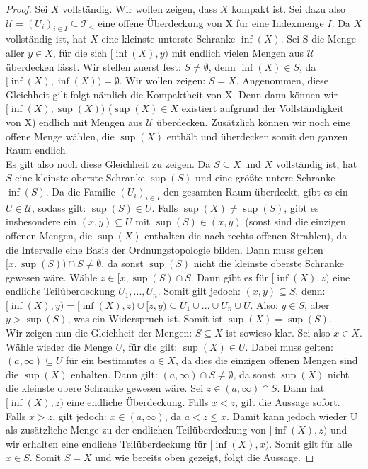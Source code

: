 \documentclass[11pt]{scrartcl}
\begin{document}
\begin{proof}
	Sei $X$ vollständig. Wir wollen zeigen, dass $X$ kompakt ist. Sei dazu also $\mathcal U = (U_i)_{i\in I} \subseteq \mathcal T_{<}$ eine offene Überdeckung von X für eine Indexmenge $I$.
	Da $X$ vollständig ist, hat $X$ eine kleinste unterste Schranke $\inf(X)$. Sei S die Menge aller $y\in X$, für die sich $[\inf(X), y)$ mit endlich vielen Mengen aus $\mathcal U$ überdecken lässt. 
	Wir stellen zuerst fest: $S\neq \emptyset$, denn $\inf(X)\in S$, da $[\inf(X), \inf(X))=\emptyset$. 
	Wir wollen zeigen: $S=X$. Angenommen, diese Gleichheit gilt folgt nämlich die Kompaktheit von X. Denn dann können wir $[\inf(X), \sup(X))$ ($\sup(X)\in X$ existiert aufgrund der Vollständigkeit von X) endlich mit Mengen aus $\mathcal U$ überdecken. 
	Zusätzlich können wir noch eine offene Menge wählen, die $\sup(X)$ enthält und überdecken somit den ganzen Raum endlich.\\
	Es gilt also noch diese Gleichheit zu zeigen. Da $S \subseteq X$ und $X$ vollständig ist, hat $S$ eine kleinste oberste Schranke $\sup(S)$ und eine größte untere Schranke $\inf(S)$. Da die Familie 
	$(U_i)_{i\in I}$ den gesamten Raum überdeckt, gibt es ein $U\in\mathcal U$, sodass gilt: $\sup(S)\in U$. Falls $\sup(X)\neq \sup(S)$, gibt es insbesondere ein $(x,y)\subseteq U$ mit $\sup(S)\in (x,y)$ 
	(sonst sind die einzigen offenen Mengen, die $\sup(X)$ enthalten die nach rechts offenen Strahlen),
	da die Intervalle eine Basis der Ordnungstopologie bilden. Dann muss gelten $[x, \sup(S)) \cap S \neq \emptyset$, da sonst $\sup(S)$ nicht die kleinste oberste Schranke gewesen wäre. Wähle $z\in 
	[x, \sup(S)\cap S$. Dann gibt es für $[\inf(X), z)$ eine endliche Teilüberdeckung $U_1,...,U_n$. Somit gilt jedoch: $(x,y)\subseteq S$, denn: $[\inf(X),y)=[\inf(X),z)\cup [z,y) \subseteq U_1 
	\cup ... \cup U_n \cup U$. Also: $y\in S$, aber $y> \sup(S)$, was ein Widerspruch ist. Somit ist $\sup(X)=\sup(S)$. \\
	Wir zeigen nun die Gleichheit der Mengen: $S\subseteq X$ ist sowieso klar. Sei also $x\in X$. Wähle wieder die Menge $U$, für die gilt: $\sup(X)\in U$. Dabei muss gelten: 
	$(a,\infty)\subseteq U$ für ein bestimmtes $a\in X$, da dies die einzigen offenen Mengen sind die $\sup(X)$ enhalten. Dann gilt: $(a, \infty)\cap S\neq 
	\emptyset$, da sonst $\sup(X)$ nicht die kleinste obere Schranke gewesen wäre. Sei $z\in (a,\infty) \cap S$. Dann hat $[\inf(X), z)$ eine endliche Überdeckung. Falls $x < z$, gilt die Aussage sofort. 
	Falls $x> z$, gilt jedoch: $x\in (a,\infty)$, da $a<z\leq x$. Damit kann jedoch wieder U als zusätzliche Menge zu der endlichen Teilüberdeckung von $[\inf(X), z)$ und wir erhalten eine endliche 
	Teilüberdeckung für $[\inf(X),x)$. Somit gilt für alle $x\in S$. Somit $S=X$ und wie bereits oben gezeigt, folgt die Aussage.
\end{proof}
\end{document}
